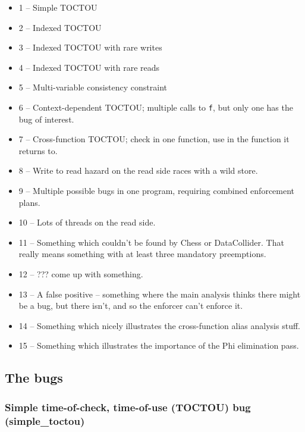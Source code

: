 \begin{itemize}
\item 1 -- Simple TOCTOU
\item 2 -- Indexed TOCTOU
\item 3 -- Indexed TOCTOU with rare writes
\item 4 -- Indexed TOCTOU with rare reads
\item 5 -- Multi-variable consistency constraint
\item 6 -- Context-dependent TOCTOU; multiple calls to \verb|f|, but
  only one has the bug of interest.
\item 7 -- Cross-function TOCTOU; check in one function, use in the
  function it returns to.
\item 8 -- Write to read hazard on the read side races with a wild
  store.
\item 9 -- Multiple possible bugs in one program, requiring combined
  enforcement plans.
\item 10 -- Lots of threads on the read side.
\item 11 -- Something which couldn't be found by Chess or
  DataCollider.  That really means something with at least three
  mandatory preemptions.
\item 12 -- ??? come up with something.
\item 13 -- A false positive -- something where the main analysis
  thinks there might be a bug, but there isn't, and so the enforcer
  can't enforce it.
\item 14 -- Something which nicely illustrates the cross-function
  alias analysis stuff.
\item 15 -- Something which illustrates the importance of the Phi
  elimination pass.
\end{itemize}

\subsection{The bugs}

\subsubsection{Simple time-of-check, time-of-use (TOCTOU) bug (simple\_toctou)}
\label{sect:eval:art:simple_toctou}


